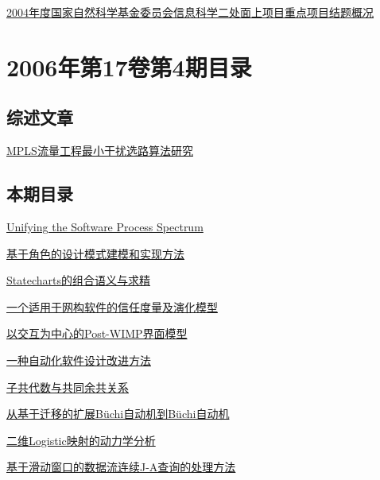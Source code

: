 \documentclass[a4paper]{article}
\begin{document}
\href{http://www.jos.org.cn/ch/reader/download_pdf.aspx?file_no=20060534&year_id=2006&quarter_id=5&falg=1}{2004年度国家自然科学基金委员会信息科学二处面上项目重点项目结题概况}


\section{\textbf{2006年第17卷第4期目录}}
\subsection{综述文章}
\href{http://www.jos.org.cn/ch/reader/download_pdf.aspx?file_no=20060417&year_id=2006&quarter_id=4&falg=1}{MPLS流量工程最小干扰选路算法研究}

\subsection{本期目录}
\href{http://www.jos.org.cn/ch/reader/download_pdf.aspx?file_no=20060401&year_id=2006&quarter_id=4&falg=1}{Unifying the Software Process Spectrum}

\href{http://www.jos.org.cn/ch/reader/download_pdf.aspx?file_no=20060402&year_id=2006&quarter_id=4&falg=1}{基于角色的设计模式建模和实现方法}

\href{http://www.jos.org.cn/ch/reader/download_pdf.aspx?file_no=20060403&year_id=2006&quarter_id=4&falg=1}{Statecharts的组合语义与求精}

\href{http://www.jos.org.cn/ch/reader/download_pdf.aspx?file_no=20060404&year_id=2006&quarter_id=4&falg=1}{一个适用于网构软件的信任度量及演化模型}

\href{http://www.jos.org.cn/ch/reader/download_pdf.aspx?file_no=20060405&year_id=2006&quarter_id=4&falg=1}{以交互为中心的Post-WIMP界面模型}

\href{http://www.jos.org.cn/ch/reader/download_pdf.aspx?file_no=20060406&year_id=2006&quarter_id=4&falg=1}{一种自动化软件设计改进方法}

\href{http://www.jos.org.cn/ch/reader/download_pdf.aspx?file_no=20060407&year_id=2006&quarter_id=4&falg=1}{子共代数与共同余共关系}

\href{http://www.jos.org.cn/ch/reader/download_pdf.aspx?file_no=20060408&year_id=2006&quarter_id=4&falg=1}{从基于迁移的扩展Büchi自动机到Büchi自动机}

\href{http://www.jos.org.cn/ch/reader/download_pdf.aspx?file_no=20060409&year_id=2006&quarter_id=4&falg=1}{二维Logistic映射的动力学分析}

\href{http://www.jos.org.cn/ch/reader/download_pdf.aspx?file_no=20060410&year_id=2006&quarter_id=4&falg=1}{基于滑动窗口的数据流连续J-A查询的处理方法}
\end{document}
